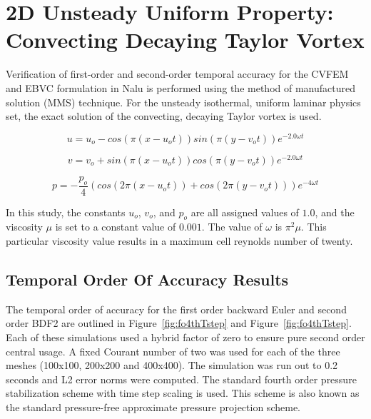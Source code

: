 \documentclass[12pt,final]{article}
\begin{document}
\section{2D Unsteady Uniform Property: Convecting Decaying Taylor Vortex}

Verification of first-order and second-order temporal accuracy for the
CVFEM and EBVC formulation in Nalu is performed using the method of manufactured 
solution (MMS) technique. For the unsteady isothermal, uniform laminar physics set,
the exact solution of the convecting, decaying Taylor vortex is used.

\begin{equation}
  u = u_o - cos(\pi(x-u_ot)) sin(\pi(y-v_ot))e^{-2.0\omega t}
\label{advConvTV_u}
\end{equation}

\begin{equation}
  v = v_o + sin(\pi(x-u_ot)) cos(\pi(y-v_ot))e^{-2.0\omega t} 
\label{advConvTV_v}
\end{equation}

\begin{equation}
  p = -\frac{p_o}{4}(cos(2\pi(x-u_ot)) + cos(2\pi(y-v_ot)))e^{-4\omega t}
\label{advConvTV_p}
\end{equation}

In this study, the constants $u_o$, $v_o$, and $p_o$ are all assigned values of $1.0$,
and the viscosity $\mu$ is set to a
constant value of $0.001$. The value of $\omega$ is $\pi^2\mu$. This particular viscosity value 
results in a maximum cell reynolds number of twenty.  

\subsection{Temporal Order Of Accuracy Results}
The temporal order of accuracy for the first order backward Euler and second order BDF2
are outlined in Figure~\ref{fig:fo4thTstep} and Figure~\ref{fig:fo4thTstep}. Each of these
simulations used a hybrid factor of zero to ensure pure second order central usage. A
fixed Courant number of two was used for each of the three meshes (100x100, 200x200 and 400x400).
The simulation was run out to 0.2 seconds and L2 error norms were computed. The standard
fourth order pressure stabilization scheme with time step scaling is used. This scheme is also
known as the standard pressure-free approximate pressure projection scheme.
\end{document}
